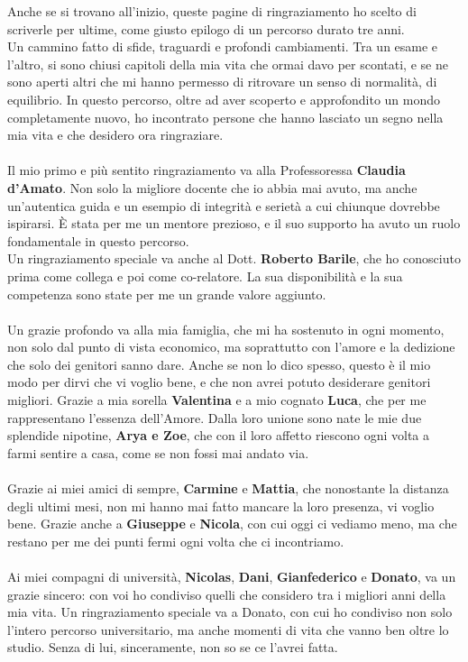 Anche se si trovano all'inizio, queste pagine di ringraziamento ho scelto di scriverle per ultime, come giusto epilogo di un percorso durato tre anni.
\\
Un cammino fatto di sfide, traguardi e profondi cambiamenti. Tra un esame e l’altro, si sono chiusi capitoli della mia vita che ormai davo per scontati, e se ne sono aperti altri che mi hanno permesso di ritrovare un senso di normalità, di equilibrio.
In questo percorso, oltre ad aver scoperto e approfondito un mondo completamente nuovo, ho incontrato persone che hanno lasciato un segno nella mia vita e che desidero ora ringraziare.
\\\\
Il mio primo e più sentito ringraziamento va alla Professoressa \textbf{Claudia d’Amato}. Non solo la migliore docente che io abbia mai avuto, ma anche un'autentica guida e un esempio di integrità e serietà a cui chiunque dovrebbe ispirarsi. È stata per me un mentore prezioso, e il suo supporto ha avuto un ruolo fondamentale in questo percorso.
\\
Un ringraziamento speciale va anche al Dott. \textbf{Roberto Barile}, che ho conosciuto prima come collega e poi come co-relatore. La sua disponibilità e la sua competenza sono state per me un grande valore aggiunto.
\\\\
Un grazie profondo va alla mia famiglia, che mi ha sostenuto in ogni momento, non solo dal punto di vista economico, ma soprattutto con l'amore e la dedizione che solo dei genitori sanno dare. Anche se non lo dico spesso, questo è il mio modo per dirvi che vi voglio bene, e che non avrei potuto desiderare genitori migliori.
Grazie a mia sorella \textbf{Valentina} e a mio cognato \textbf{Luca}, che per me rappresentano l'essenza dell'Amore.
Dalla loro unione sono nate le mie due splendide nipotine, \textbf{Arya e Zoe}, che con il loro affetto riescono ogni volta a farmi sentire a casa, come se non fossi mai andato via.
\\\\
Grazie ai miei amici di sempre, \textbf{Carmine} e \textbf{Mattia}, che nonostante la distanza degli ultimi mesi, non mi hanno mai fatto mancare la loro presenza, vi voglio bene.
Grazie anche a \textbf{Giuseppe} e \textbf{Nicola}, con cui oggi ci vediamo meno, ma che restano per me dei punti fermi ogni volta che ci incontriamo.
\\\\
Ai miei compagni di università, \textbf{Nicolas}, \textbf{Dani}, \textbf{Gianfederico} e \textbf{Donato}, va un grazie sincero: con voi ho condiviso quelli che considero tra i migliori anni della mia vita. Un ringraziamento speciale va a Donato, con cui ho condiviso non solo l'intero percorso universitario, ma anche momenti di vita che vanno ben oltre lo studio. Senza di lui, sinceramente, non so se ce l'avrei fatta.
